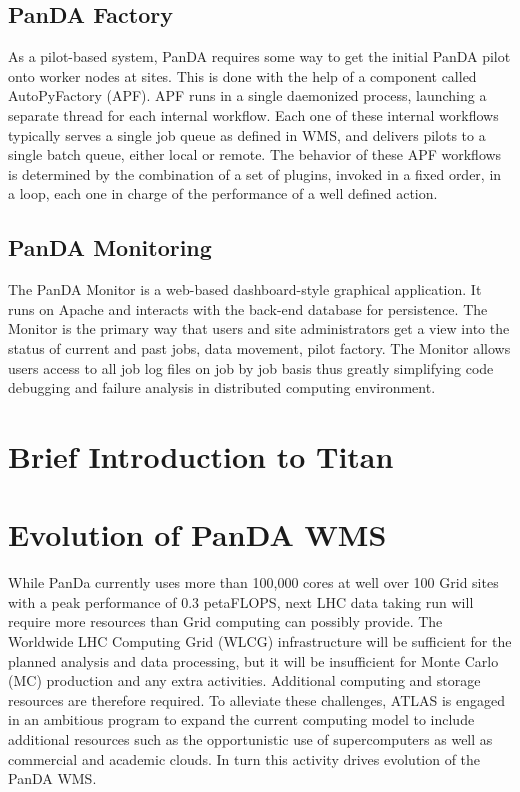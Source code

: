 \documentclass[10pt, conference, compsocconf]{IEEEtran}
\begin{document}
\subsection{PanDA Factory}
As a pilot-based  system, PanDA  requires some way to get the initial PanDA pilot onto worker nodes at sites. This is done with the help of a component  called AutoPyFactory (APF). APF runs in a single daemonized process, launching  a separate thread for each internal  workflow. Each one of these internal workflows typically serves  a single job queue  as defined  in WMS, and delivers pilots to a single batch queue, either local or remote. The behavior of these APF workflows is determined by the combination of a set  of plugins, invoked in a  fixed order, in a loop, each one in charge of the performance of a well defined action.

\subsection{PanDA Monitoring}
The PanDA Monitor is a web-based dashboard-style  graphical application. It runs on Apache and interacts with the back-end database for persistence. The Monitor is the primary way that users and site administrators get a  view into the status of current and past jobs, data movement,  pilot factory. The Monitor allows users  access  to all job log files on job by job basis thus greatly simplifying code debugging and failure analysis in distributed computing environment.

\section{Brief Introduction to Titan}


\section{Evolution of PanDA WMS}
While PanDa  currently uses  more than 100,000  cores at well over 100 Grid sites with a  peak performance  of 0.3 petaFLOPS,  next LHC data taking run will  require more resources  than Grid computing can possibly provide. The Worldwide LHC Computing Grid (WLCG) infrastructure will be sufficient for the planned analysis and data processing, but it will be insufficient  for Monte Carlo (MC) production and any extra activities. Additional computing and storage  resources are therefore required.  To alleviate  these challenges, ATLAS is engaged  in an ambitious  program to expand  the current computing model to include  additional  resources such as the opportunistic   use of supercomputers   as well as commercial and academic clouds. In turn this activity drives evolution of the PanDA WMS.
\end{document}
